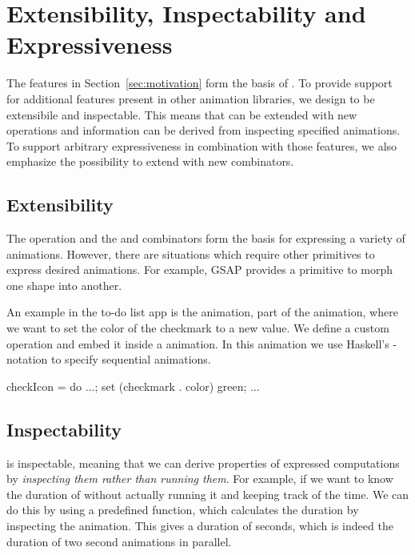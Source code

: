 \section{Extensibility, Inspectability and Expressiveness}
\label{sec:features}

The features in Section~\ref{sec:motivation} form the basis of \dsl{}.
To provide support for additional features present in other animation libraries,
we design \dsl{} to be extensibile and
inspectable. This means that \dsl{} can be extended with new
operations and information can be derived from inspecting specified animations.
To support arbitrary expressiveness in combination with those
features, we also emphasize the possibility to extend \dsl{} with new
combinators.

\subsection{Extensibility}
\label{sec:customop}

The  operation and the  and  combinators form the basis for expressing a variety of animations. However, there are situations which require other primitives to express desired animations. For example, GSAP provides a primitive to morph one shape into another.

An example in the to-do list app is the  animation, part of the  animation, where we want to set the color of the checkmark to a new value. We define a custom  operation and embed it inside a \dsl{} animation. In this animation we use Haskell's -notation to specify sequential animations.

\begin{spec}
checkIcon = do ...; set (checkmark . color) green; ...
\end{spec}


\subsection{Inspectability}

\dsl{} is inspectable, meaning that we can derive properties of expressed computations by \emph{inspecting them rather than running them}. For example, if we want to know the duration of  without actually running it and keeping track of the time. We can do this by using a predefined  function, which calculates the duration by inspecting the animation. This gives a duration of  seconds, which is indeed the duration of two  second animations in parallel.

